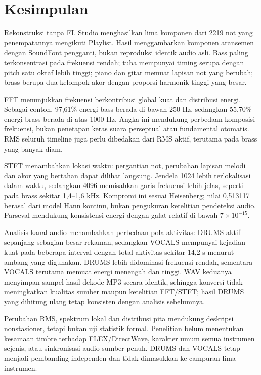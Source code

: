 \section{Kesimpulan}
Rekonstruksi tanpa FL Studio menghasilkan lima komponen dari 2219 not
yang penempatannya mengikuti Playlist. Hasil menggambarkan komponen
aransemen dengan SoundFont pengganti, bukan reproduksi identik audio
asli. Bass paling terkonsentrasi pada frekuensi rendah; tuba mempunyai
timing serupa dengan pitch satu oktaf lebih tinggi; piano dan gitar
memuat lapisan not yang berubah; brass berupa dua kelompok akor
dengan proporsi harmonik tinggi yang besar.

FFT menunjukkan frekuensi berkontribusi global kuat dan distribusi
energi. Sebagai contoh, 97,61\% energi bass berada di bawah 250 Hz,
sedangkan 55,70\% energi brass berada di atas 1000 Hz. Angka ini
mendukung perbedaan komposisi frekuensi, bukan penetapan keras suara
perseptual atau fundamental otomatis. RMS seluruh timeline juga
perlu dibedakan dari RMS aktif, terutama pada brass yang banyak diam.

STFT menambahkan lokasi waktu: pergantian not, perubahan lapisan
melodi dan akor yang bertahan dapat dilihat langsung. Jendela 1024
lebih terlokalisasi dalam waktu, sedangkan 4096 memisahkan garis
frekuensi lebih jelas, seperti pada brass sekitar 1,4--1,6 kHz.
Kompromi ini sesuai Heisenberg; nilai 0,513117 berasal dari model
Hann kontinu, bukan pengukuran ketelitian pendeteksi audio.
Parseval mendukung konsistensi energi dengan galat relatif di bawah
$7\times10^{-15}$.

Analisis kanal audio menambahkan perbedaan pola aktivitas: DRUMS
aktif sepanjang sebagian besar rekaman, sedangkan VOCALS mempunyai
kejadian kuat pada beberapa interval dengan total aktivitas sekitar
14,2 s menurut ambang yang digunakan. DRUMS lebih didominasi
frekuensi rendah, sementara VOCALS terutama memuat energi menengah
dan tinggi. WAV keduanya menyimpan sampel hasil dekode MP3 secara
identik, sehingga konversi tidak meningkatkan kualitas sumber maupun
ketelitian FFT/STFT; hasil DRUMS yang dihitung ulang tetap konsisten
dengan analisis sebelumnya.

Perubahan RMS, spektrum lokal dan distribusi pita mendukung deskripsi
nonstasioner, tetapi bukan uji statistik formal. Penelitian belum
menentukan kesamaan timbre terhadap FLEX/DirectWave, karakter umum
semua instrumen sejenis, atau sinkronisasi audio sumber penuh.
DRUMS dan VOCALS tetap menjadi pembanding independen dan tidak
dimasukkan ke campuran lima instrumen.

